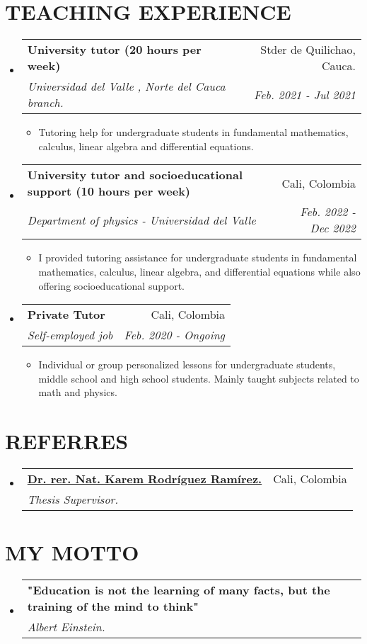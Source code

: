 \documentclass[a4paper,20pt]{article}
\makeatletter
\newcommand{\resumeSubheading}[4]{
  \vspace{-1pt}\item
    \begin{tabular*}{0.97\textwidth}{l@{\extracolsep{\fill}}r}
      \textbf{#1} & #2 \\
      \textit{#3} & \textit{#4} \\
    \end{tabular*}\vspace{-5pt}
}
\newcommand{\resumeSubHeadingListStart}{\begin{itemize}[leftmargin=*]}
\newcommand{\resumeSubHeadingListEnd}{\end{itemize}}
\makeatother
\begin{document}
\section{\textbf{TEACHING EXPERIENCE}}
\resumeSubHeadingListStart
        \resumeSubheading
        {University tutor (20 hours per week)}{\faMapMarker \hspace{1mm} Stder de Quilichao, Cauca.}
        {Universidad del Valle , Norte del Cauca branch.}{Feb. 2021 - Jul 2021} 
            \begin{itemize}[leftmargin=*]
                \item Tutoring help for undergraduate students in fundamental mathematics, calculus, linear algebra and differential equations.
            \end{itemize}
\resumeSubHeadingListEnd
\vspace{-5mm}
\resumeSubHeadingListStart
        \resumeSubheading
        {University tutor and socioeducational support (10 hours per week)}{\faMapMarker \hspace{1mm} Cali, Colombia}
        {Department of physics - Universidad del Valle }{Feb. 2022 - Dec 2022} 
            \begin{itemize}[leftmargin=*]
                \item I provided tutoring assistance for undergraduate students in fundamental mathematics, calculus, linear algebra, and differential equations while also offering socioeducational support.
            \end{itemize}
\resumeSubHeadingListEnd
\vspace{-5mm}
\resumeSubHeadingListStart
        \resumeSubheading
        {Private Tutor}{\faMapMarker \hspace{1mm} Cali, Colombia}
        {Self-employed job }{Feb. 2020 - Ongoing} 
            \begin{itemize}[leftmargin=*]
                \item Individual or group personalized lessons for undergraduate students, middle school and high school students. Mainly taught subjects related to math and physics.
            \end{itemize}
\resumeSubHeadingListEnd
\section{\textbf{REFERRES}}
\vspace{0.5mm}
    \resumeSubHeadingListStart
        \resumeSubheading
        {\href{https://sites.google.com/a/correounivalle.edu.co/karen-rodriguez/home}{Dr. rer. Nat. Karem Rodríguez Ramírez. \faExternalLink }}{\faMapMarker \hspace{1mm} Cali, Colombia}
        {Thesis Supervisor. }{}
    \resumeSubHeadingListEnd
\section{\textbf{MY MOTTO}}
  \resumeSubHeadingListStart
\vspace{2mm}
    \resumeSubheading 
    {"Education is not the learning of many facts, but the training of the mind to think"}{}
    {Albert Einstein.}{}
\vspace{5pt}

\resumeSubHeadingListEnd
\end{document}
